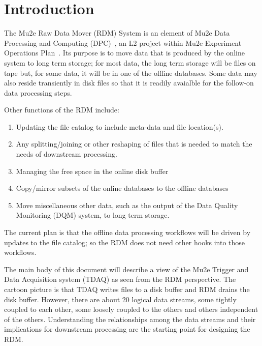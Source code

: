 \chapter{Introduction}

\label{ch:intro}

The Mu2e Raw Data Mover (RDM) System is an element of Mu2e Data Processing
and Computing (DPC)~\cite{DPC}, an L2 project within Mu2e Experiment Operations Plan~\cite{PEOP}.
Its purpose is to move data
that is produced by the online system to long term storage;
for most data, the long term storage will be files on tape
but, for some data, it will be in one of the offline databases.
Some data may also reside transiently in disk files so that
it is readily avaialble for the follow-on data processing steps.

Other functions of the RDM include:
\begin{enumerate}
\item Updating the file catalog to include meta-data and file location(s).
\item Any splitting/joining or other reshaping of files that is needed to match the needs of downstream processing.
\item Managing the free space in the online disk buffer
\item Copy/mirror subsets of the online databases to the offline databases
\item Move miscellaneous other data, such as the output of the Data Quality Monitoring (DQM) system, to long term storage.
\end{enumerate}

The current plan is that the offline data processing workflows will be driven by updates to the file catalog;
so the RDM does not need other hooks into those workflows.



The main body of this document will describe a view of the
Mu2e Trigger and Data Acquisition system (TDAQ) as seen from the RDM perspective.
The cartoon picture is that TDAQ writes files to a disk buffer and RDM drains the disk buffer.
However, there are about 20 logical data streams, some tightly coupled to each
other, some loosely coupled to the others and others independent of the others.
Understanding the relationships among the data streams and their implications
for downstream processing are the starting point for designing the RDM.

